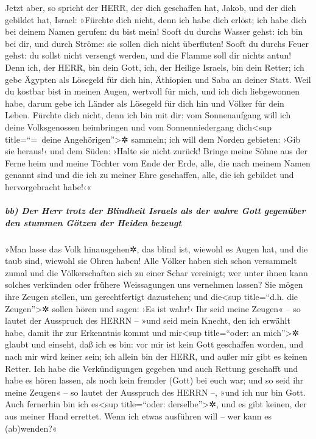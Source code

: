 Jetzt aber, so spricht der HERR, der dich geschaffen hat,
Jakob, und der dich gebildet hat, Israel: »Fürchte dich nicht, denn ich
habe dich erlöst; ich habe dich bei deinem Namen gerufen: du bist mein!
Sooft du durchs Wasser gehst: ich bin bei dir, und durch
Ströme: sie sollen dich nicht überfluten! Sooft du durchs Feuer gehst:
du sollst nicht versengt werden, und die Flamme soll dir nichts antun!
Denn ich, der HERR, bin dein Gott, ich, der Heilige
Israels, bin dein Retter; ich gebe Ägypten als Lösegeld für dich hin,
Äthiopien und Saba an deiner Statt. Weil du kostbar bist
in meinen Augen, wertvoll für mich, und ich dich liebgewonnen habe,
darum gebe ich Länder als Lösegeld für dich hin und Völker für dein
Leben. Fürchte dich nicht, denn ich bin mit dir: vom
Sonnenaufgang will ich deine Volksgenossen heimbringen und vom
Sonnenniedergang dich\textless sup title=``=~deine
Angehörigen''\textgreater✲ sammeln; ich will dem Norden
gebieten: ›Gib sie heraus!‹ und dem Süden: ›Halte sie nicht zurück!
Bringe meine Söhne aus der Ferne heim und meine Töchter vom Ende der
Erde, alle, die nach meinem Namen genannt sind und die ich
zu meiner Ehre geschaffen, alle, die ich gebildet und hervorgebracht
habe!‹«

\hypertarget{bb-der-herr-trotz-der-blindheit-israels-als-der-wahre-gott-gegenuxfcber-den-stummen-guxf6tzen-der-heiden-bezeugt}{%
\subparagraph{bb) Der Herr trotz der Blindheit Israels als der wahre
Gott gegenüber den stummen Götzen der Heiden
bezeugt}\label{bb-der-herr-trotz-der-blindheit-israels-als-der-wahre-gott-gegenuxfcber-den-stummen-guxf6tzen-der-heiden-bezeugt}}

»Man lasse das Volk hinausgehen✲, das blind ist, wiewohl
es Augen hat, und die taub sind, wiewohl sie Ohren haben!
Alle Völker haben sich schon versammelt zumal und die
Völkerschaften sich zu einer Schar vereinigt; wer unter ihnen kann
solches verkünden oder frühere Weissagungen uns vernehmen lassen? Sie
mögen ihre Zeugen stellen, um gerechtfertigt dazustehen; und
die\textless sup title=``d.h. die Zeugen''\textgreater✲ sollen hören und
sagen: ›Es ist wahr!‹ Ihr seid meine Zeugen« -- so lautet
der Ausspruch des HERRN -- »und seid mein Knecht, den ich erwählt habe,
damit ihr zur Erkenntnis kommt und mir\textless sup title=``oder: an
mich''\textgreater✲ glaubt und einseht, daß ich es bin: vor mir ist kein
Gott geschaffen worden, und nach mir wird keiner sein;
ich allein bin der HERR, und außer mir gibt es keinen
Retter. Ich habe die Verkündigungen gegeben und auch
Rettung geschafft und habe es hören lassen, als noch kein fremder (Gott)
bei euch war; und so seid ihr meine Zeugen« -- so lautet der Ausspruch
des HERRN --, »und ich nur bin Gott. Auch fernerhin bin
ich es\textless sup title=``oder: derselbe''\textgreater✲, und es gibt
keinen, der aus meiner Hand errettet. Wenn ich etwas ausführen will --
wer kann es (ab)wenden?«

